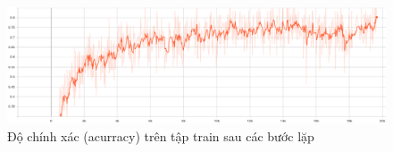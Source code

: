 \begin{figure}[!ht]
    \begin{center}
        \includegraphics[width=\linewidth]{asset/image/first-result.png}
        \caption{Độ chính xác (acurracy) trên tập train sau các bước lặp}
        \label{fig:first-result}
    \end{center}
\end{figure}
